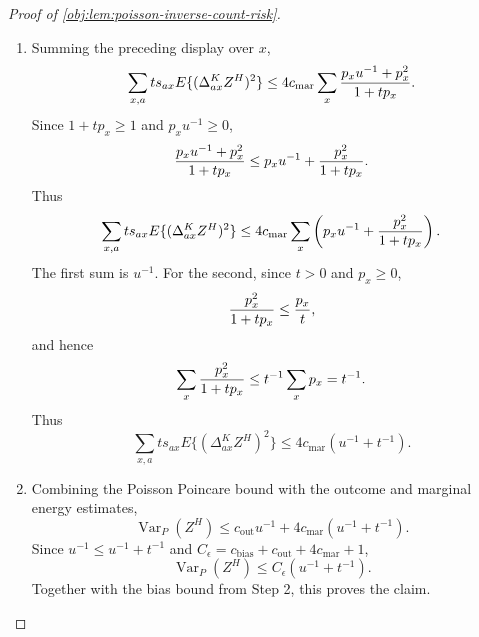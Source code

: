 \documentclass[11pt]{article}
\begin{document}
\begin{proof}[Proof of \cref{obj:lem:poisson-inverse-count-risk}]
\begin{enumerate}
satisfy \(0\le q_{ax}\le p_x\); overlap gives
\(\epsilon\Theta_x\le\theta_{ax}\), while \(s_{ax}\le p_x\) gives
\(\theta_{ax}\le\Theta_x\); and the displayed reciprocal estimates give the required
second- and fourth-moment rate conditions.  Therefore
\cref{obj:lem:poisson-inverse-marginal-energy-scalar} yields
\[
\begin{aligned}
&\theta_{1x}\bigl\{(q_{1x}u^{-1}+q_{1x}^2)(\theta_{0x}+\theta_{0x}^2)\eta_{4,1}
 +(q_{0x}u^{-1}+q_{0x}^2)\eta_{2,0}\bigr\} \\
&\quad+
\theta_{0x}\bigl\{(q_{0x}u^{-1}+q_{0x}^2)(\theta_{1x}+\theta_{1x}^2)\eta_{4,0}
 +(q_{1x}u^{-1}+q_{1x}^2)\eta_{2,1}\bigr\} \\
&\hspace{3cm}\le
(p_xu^{-1}+p_x^2){2c_{\mathrm{mar}}\over1+\Theta_x}.
\end{aligned}
\]
Multiplying the add-one-square bounds by their Poisson rates \(\theta_{ax}=ts_{ax}\), summing over \(a\), and using the preceding display gives the cell estimate
\[
\sum_a ts_{ax}E\{(\Delta^K_{ax}Z^H)^2\}
\le
4c_{\mathrm{mar}}\,
{p_xu^{-1}+p_x^2\over 1+tp_x}.
\]

\item
Summing the preceding display over \(x\),
\[
\sum_{x,a}ts_{ax}E\{(\Delta^K_{ax}Z^H)^2\}
\le
4c_{\mathrm{mar}}
\sum_x{p_xu^{-1}+p_x^2\over 1+tp_x}.
\]
Since \(1+tp_x\ge1\) and \(p_xu^{-1}\ge0\),
\[
{p_xu^{-1}+p_x^2\over 1+tp_x}
\le
p_xu^{-1}+{p_x^2\over 1+tp_x}.
\]
Thus
\[
\sum_{x,a}ts_{ax}E\{(\Delta^K_{ax}Z^H)^2\}
\le
4c_{\mathrm{mar}}
\sum_x\left(p_xu^{-1}+{p_x^2\over 1+tp_x}\right).
\]
The first sum is \(u^{-1}\).  For the second, since \(t>0\) and \(p_x\ge0\),
\[
{p_x^2\over 1+tp_x}\le {p_x\over t},
\]
and hence
\[
\sum_x{p_x^2\over 1+tp_x}\le t^{-1}\sum_xp_x=t^{-1}.
\]
Thus
\[
\sum_{x,a}ts_{ax}E\{(\Delta^K_{ax}Z^H)^2\}
\le
4c_{\mathrm{mar}}(u^{-1}+t^{-1}).
\]

\item
Combining the Poisson Poincare bound with the outcome and marginal energy estimates,
\[
\operatorname{Var}_P(Z^H)
\le
c_{\mathrm{out}}u^{-1}+4c_{\mathrm{mar}}(u^{-1}+t^{-1}).
\]
Since \(u^{-1}\le u^{-1}+t^{-1}\) and
\(C_\epsilon=c_{\mathrm{bias}}+c_{\mathrm{out}}+4c_{\mathrm{mar}}+1\),
\[
\operatorname{Var}_P(Z^H)
\le
C_\epsilon(u^{-1}+t^{-1}).
\]
Together with the bias bound from Step 2, this proves the claim. %
\end{enumerate}
\end{proof}
\end{document}
